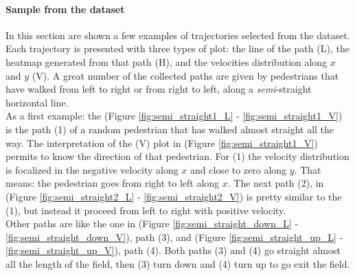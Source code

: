\documentclass[class=article, crop=false]{standalone}
\begin{document}
\paragraph{Sample from the dataset}
In this section are shown a few examples of trajectories selected from the dataset.
Each trajectory is presented with three types of plot: the line of the path (L), the heatmap generated from that path (H), and the velocities distribution along $x$ and $y$ (V).
A great number of the collected paths are given by pedestrians that have walked from left to right or from right to left, along a \emph{semi}-straight horizontal line.
\\As a first example: the (Figure \ref{fig:semi_straight1_L} - \ref{fig:semi_straight1_V}) is the path (1) of a random pedestrian that has walked almost straight all the way.
The interpretation of the (V) plot in (Figure \ref{fig:semi_straight1_V}) permits to know the direction of that pedestrian.
For (1) the velocity distribution is focalized in the negative velocity along $x$ and close to zero along $y$.
That means: the pedestrian goes from right to left along $x$.
The next path (2), in (Figure \ref{fig:semi_straight2_L} - \ref{fig:semi_straight2_V}) is pretty similar to the (1), but instead it proceed from left to right with positive velocity.
\\Other paths are like the one in (Figure \ref{fig:semi_straight_down_L} - \ref{fig:semi_straight_down_V}), path (3), and (Figure \ref{fig:semi_straight_up_L} - \ref{fig:semi_straight_up_V}), path (4).
Both paths (3) and (4) go straight almost all the length of the field, then (3) turn down and (4) turn up to go exit the field.
\end{document}
